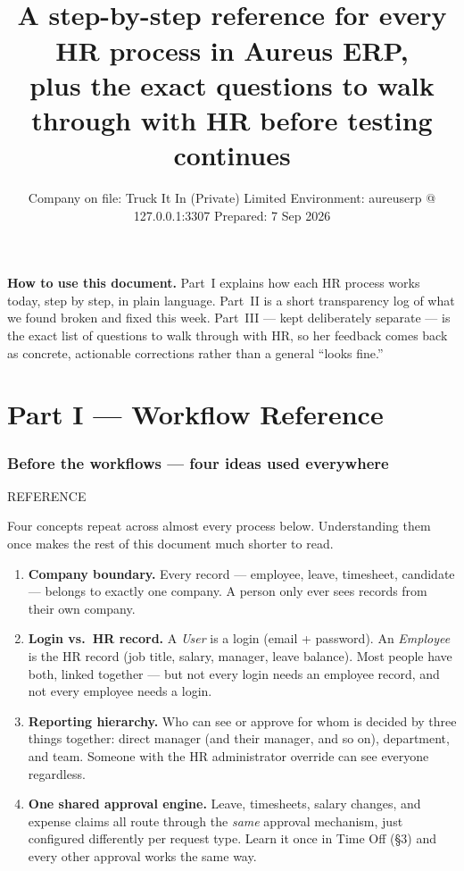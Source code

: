\documentclass[11pt,a4paper]{article}
\title{\vspace{-2em}{\bfseries\Huge HR Workflow Handbook}\\[6pt]
\large\color{inksoft} A step-by-step reference for every HR process in Aureus ERP,\\
plus the exact questions to walk through with HR before testing continues}
\author{}
\date{\small Company on file: Truck It In (Private) Limited \quad\textbar\quad
Environment: aureuserp @ 127.0.0.1:3307 \quad\textbar\quad Prepared: 7 Sep 2026}
\newcommand{\eyebrow}[1]{{\small\ttfamily\color{accentdark} #1}\par\vspace{2pt}}
\begin{document}
\maketitle
\thispagestyle{fancy}

\begin{callout}
\textbf{How to use this document.} Part~I explains how each HR process works today, step by step, in plain language. Part~II is a short transparency log of what we found broken and fixed this week. Part~III — kept deliberately separate — is the exact list of questions to walk through with HR, so her feedback comes back as concrete, actionable corrections rather than a general ``looks fine.''
\end{callout}

\tableofcontents

\newpage
\part*{Part I --- Workflow Reference}

\section*{Before the workflows --- four ideas used everywhere}
\eyebrow{REFERENCE}
Four concepts repeat across almost every process below. Understanding them once makes the rest of this document much shorter to read.

\begin{enumerate}[label=\textbf{\arabic*.}, leftmargin=1.6em]
  \item \textbf{Company boundary.} Every record --- employee, leave, timesheet, candidate --- belongs to exactly one company. A person only ever sees records from their own company.
  \item \textbf{Login vs.\ HR record.} A \emph{User} is a login (email + password). An \emph{Employee} is the HR record (job title, salary, manager, leave balance). Most people have both, linked together --- but not every login needs an employee record, and not every employee needs a login.
  \item \textbf{Reporting hierarchy.} Who can see or approve for whom is decided by three things together: direct manager (and their manager, and so on), department, and team. Someone with the HR administrator override can see everyone regardless.
  \item \textbf{One shared approval engine.} Leave, timesheets, salary changes, and expense claims all route through the \emph{same} approval mechanism, just configured differently per request type. Learn it once in Time Off (\S 3) and every other approval works the same way.
\end{enumerate}
\end{document}
